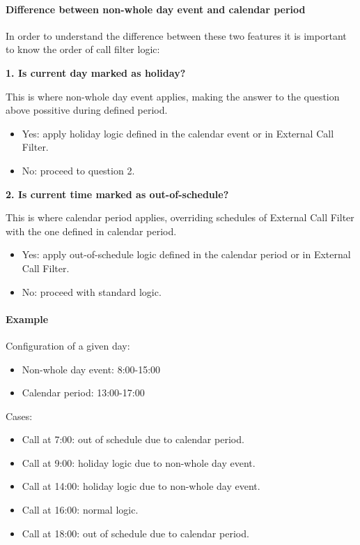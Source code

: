 \documentclass[letterpaper,10pt,spanish]{sphinxmanual}
\begin{document}
\paragraph{Difference between non-whole day event and calendar period}
\label{administration_portal/client/vpbx/routing_tools/calendars:difference-between-non-whole-day-event-and-calendar-period}
In order to understand the difference between these two features it is important to know the order of call filter logic:

\textbf{1. Is current day marked as holiday?}

This is where non-whole day event applies, making the answer to the question above possitive during defined period.
\begin{itemize}
\item {} 
Yes: apply holiday logic defined in the calendar event or in External Call Filter.

\item {} 
No: proceed to question 2.

\end{itemize}

\textbf{2. Is current time marked as out-of-schedule?}

This is where calendar period applies, overriding schedules of External Call Filter with the one defined in calendar
period.
\begin{itemize}
\item {} 
Yes: apply out-of-schedule logic defined in the calendar period or in External Call Filter.

\item {} 
No: proceed with standard logic.

\end{itemize}
\paragraph{Example}

Configuration of a given day:
\begin{itemize}
\item {} 
Non-whole day event: 8:00-15:00

\item {} 
Calendar period: 13:00-17:00

\end{itemize}

Cases:
\begin{itemize}
\item {} 
Call at 7:00: out of schedule due to calendar period.

\item {} 
Call at 9:00: holiday logic due to non-whole day event.

\item {} 
Call at 14:00: holiday logic due to non-whole day event.

\item {} 
Call at 16:00: normal logic.

\item {} 
Call at 18:00: out of schedule due to calendar period.

\end{itemize}
\end{document}
